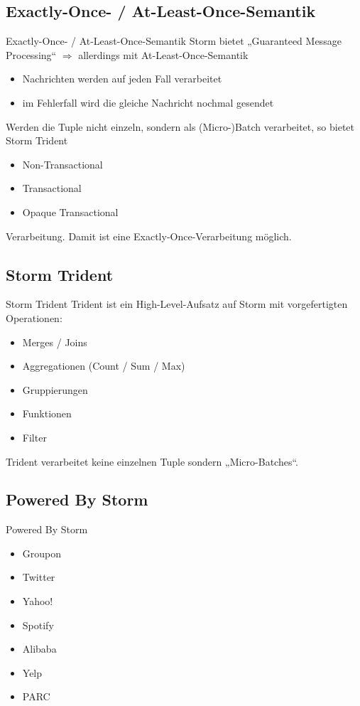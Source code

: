 \documentclass{beamer}
\begin{document}
\subsection{Exactly-Once- / At-Least-Once-Semantik}
\begin{frame}[t]{Exactly-Once- / At-Least-Once-Semantik}
  Storm bietet „Guaranteed Message Processing“ $\Rightarrow$ allerdings mit
  At-Least-Once-Semantik
  \begin{itemize}
    \item Nachrichten werden auf jeden Fall verarbeitet
    \item im Fehlerfall wird die gleiche Nachricht nochmal gesendet
  \end{itemize}
  Werden die Tuple nicht einzeln, sondern als (Micro-)Batch verarbeitet, so bietet Storm Trident
  \begin{itemize}
    \item Non-Transactional
    \item Transactional
    \item Opaque Transactional
  \end{itemize}
  Verarbeitung. Damit ist eine Exactly-Once-Verarbeitung möglich.
\end{frame}

\subsection{Storm Trident}
\begin{frame}[t]{Storm Trident}
  Trident ist ein High-Level-Aufsatz auf Storm mit vorgefertigten Operationen:
  \begin{itemize}
    \item Merges / Joins
    \item Aggregationen (Count / Sum / Max)
    \item Gruppierungen
    \item Funktionen
    \item Filter
  \end{itemize}
  Trident verarbeitet keine einzelnen Tuple sondern „Micro-Batches“.
\end{frame}

\subsection{Powered By Storm}
\begin{frame}[t]{Powered By Storm}
  \begin{itemize}
    \item Groupon
    \item Twitter
    \item Yahoo!
    \item Spotify
    \item Alibaba
    \item Yelp
    \item PARC
  \end{itemize}
\end{frame}
\end{document}
